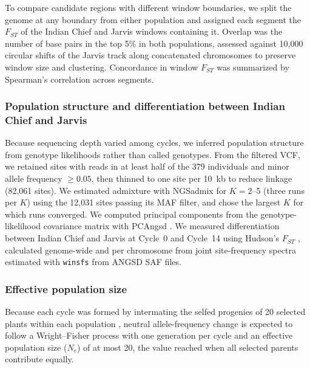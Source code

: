 \documentclass[namedate,unnumsec,webpdf,contemporary,large]{oup-authoring-template}
\begin{document}
To compare candidate regions with different window boundaries, we split the genome at any boundary from either population and assigned each segment the $F_{ST}$ of the Indian Chief and Jarvis windows containing it. Overlap was the number of base pairs in the top 5\% in both populations, assessed against 10,000 circular shifts of the Jarvis track along concatenated chromosomes to preserve window size and clustering. Concordance in window $F_{ST}$ was summarized by Spearman’s correlation across segments.

\subsubsection{Population structure and differentiation between Indian Chief and Jarvis}

Because sequencing depth varied among cycles, we inferred population structure from genotype likelihoods rather than called genotypes. From the filtered VCF, we retained sites with reads in at least half of the 379 individuals and minor allele frequency $\ge 0.05$, then thinned to one site per 10~kb to reduce linkage (82,061 sites). We estimated admixture with NGSadmix \citep{Skotte2013NGSadmix} for $K=2$--5 (three runs per $K$) using the 12,031 sites passing its MAF filter, and chose the largest $K$ for which runs converged. We computed principal components from the genotype-likelihood covariance matrix with PCAngsd \citep{Meisner2018PCAngsd}. We measured differentiation between Indian Chief and Jarvis at Cycle~0 and Cycle~14 using Hudson's $F_{ST}$ \citep{Bhatia2013Fst}, calculated genome-wide and per chromosome from joint site-frequency spectra estimated with \texttt{winsfs} \citep{Rasmussen2022winsfs} from ANGSD SAF files.

\subsubsection{Effective population size}
Because each cycle was formed by intermating the selfed progenies of 20 selected plants within each population \citep{MollStuber1971}, neutral allele-frequency change is expected to follow a Wright--Fisher process with one generation per cycle and an effective population size ($N_e$) of at most 20, the value reached when all selected parents contribute equally.
\end{document}

